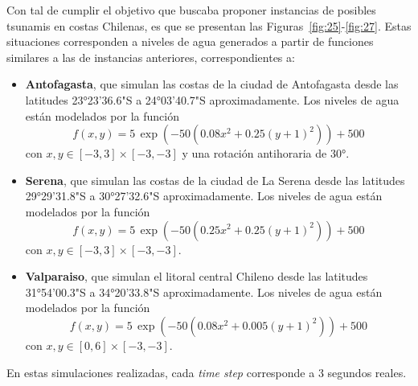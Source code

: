 %

Con tal de cumplir el objetivo que buscaba proponer instancias de posibles tsunamis en costas Chilenas, es que se presentan las 
Figuras~\ref{fig:25}-\ref{fig:27}.
Estas situaciones corresponden a niveles de agua generados a partir de funciones similares a las de instancias anteriores, correspondientes a:

\begin{itemize}
    \item \textbf{Antofagasta}, que simulan las costas de la ciudad de Antofagasta desde las latitudes 23°23'36.6"S a 24°03'40.7"S aproximadamente. 
    Los niveles de agua están modelados por la función
    \begin{equation*}
        f(x,y) = 5\,\exp\left(-50(0.08x^2 + 0.25(y+1)^2)\right) + 500
    \end{equation*}
    con \(x,y\in[-3,3]\times[-3,-3]\) y una rotación antihoraria de 30°.
    \item \textbf{Serena}, que simulan las costas de la ciudad de La Serena desde las latitudes 29°29'31.8"S a 30°27'32.6"S aproximadamente.
    Los niveles de agua están modelados por la función
    \begin{equation*}
        f(x,y) = 5\,\exp\left(-50(0.25x^2 + 0.25(y+1)^2)\right) + 500
    \end{equation*}
    con \(x,y\in[-3,3]\times[-3,-3]\).
    \item \textbf{Valparaiso}, que simulan el litoral central Chileno desde las latitudes 31°54'00.3"S a 34°20'33.8"S aproximadamente.
    Los niveles de agua están modelados por la función
    \begin{equation*}
        f(x,y) = 5\,\exp\left(-50(0.08x^2 + 0.005(y+1)^2)\right) + 500
    \end{equation*}
    con \(x,y\in[0,6]\times[-3,-3]\).
\end{itemize}

En estas simulaciones realizadas, cada \textit{time step} corresponde a 3 segundos reales.




